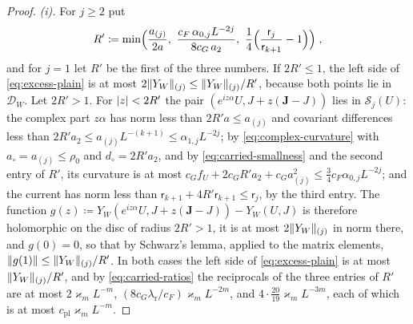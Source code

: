 \documentclass[11pt]{preprint}
\DeclarePairedDelimiter{\abs}{\lvert}{\rvert}
\DeclarePairedDelimiter{\norm}{\lVert}{\rVert}
\numberwithin{equation}{section}
\theoremstyle{definition}
\theoremstyle{remark}
\theoremstyle{plain}
\begin{document}
\begin{proof}
\emph{(i).} For $j \geq 2$ put
\[
    R' \coloneqq \min\Bigl(\frac{a_{(j)}}{2a},\ \frac{c_F\,\alpha_{0,j}L^{-2j}}{8c_G\,a_2},\ \frac14\Bigl(\frac{\mathsf r_j}{\mathsf r_{k+1}} - 1\Bigr)\Bigr)\;,
\]
and for $j = 1$ let $R'$ be the first of the three numbers. If $2R' \leq 1$, the left side of \eqref{eq:excess-plain} is at most $2\norm{Y_W}_{(j)} \leq \norm{Y_W}_{(j)}/R'$, because both points lie in $\mathcal D_W$. Let $2R' > 1$. For $\abs z < 2R'$ the pair $(e^{iz\alpha}U, J + z(\mathbf J - J))$ lies in $\mathcal S_j(U)$: the complex part $z\alpha$ has norm less than $2R'a \leq a_{(j)}$ and covariant differences less than $2R'a_2 \leq a_{(j)}L^{-(k+1)} \leq \alpha_{1,j}L^{-2j}$; by \eqref{eq:complex-curvature} with $a_\circ = a_{(j)} \leq \rho_0$ and $d_\circ = 2R'a_2$, and by \eqref{eq:carried-smallness} and the second entry of $R'$, its curvature is at most $c_Gf_U + 2c_GR'a_2 + c_Ga_{(j)}^2 \leq \frac34c_F\alpha_{0,j}L^{-2j}$; and the current has norm less than $\mathsf r_{k+1} + 4R'\mathsf r_{k+1} \leq \mathsf r_j$, by the third entry. The function $g(z) \coloneqq Y_W(e^{iz\alpha}U, J + z(\mathbf J - J)) - Y_W(U, J)$ is therefore holomorphic on the disc of radius $2R' > 1$, it is at most $2\norm{Y_W}_{(j)}$ in norm there, and $g(0) = 0$, so that by Schwarz's lemma, applied to the matrix elements, $\norm{g(1)} \leq \norm{Y_W}_{(j)}/R'$. In both cases the left side of \eqref{eq:excess-plain} is at most $\norm{Y_W}_{(j)}/R'$, and by \eqref{eq:carried-ratios} the reciprocals of the three entries of $R'$ are at most $2\varkappa_mL^{-m}$, $(8c_G\lambda_{\mathrm r}/c_F)\varkappa_mL^{-2m}$, and $4 \cdot \frac{20}{19}\varkappa_mL^{-3m}$, each of which is at most $c_{\mathrm{pl}}\varkappa_mL^{-m}$.


\end{proof}
\end{document}
